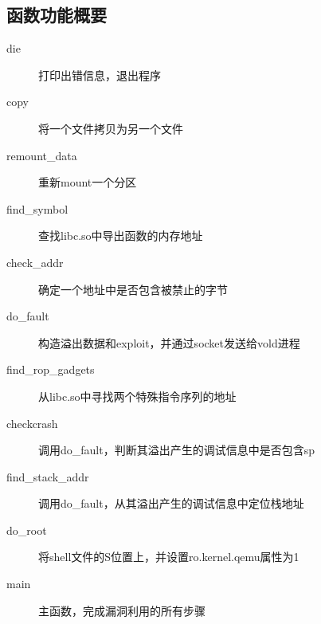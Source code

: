 \subsection{函数功能概要}

\begin{description}
\item[die] 打印出错信息，退出程序
\item[copy] 将一个文件拷贝为另一个文件
\item[remount\_data] 重新mount一个分区
\item[find\_symbol] 查找libc.so中导出函数的内存地址
\item[check\_addr] 确定一个地址中是否包含被禁止的字节
\item[do\_fault] 构造溢出数据和exploit，并通过socket发送给vold进程
\item[find\_rop\_gadgets] 从libc.so中寻找两个特殊指令序列的地址
\item[checkcrash] 调用do\_fault，判断其溢出产生的调试信息中是否包含sp
\item[find\_stack\_addr] 调用do\_fault，从其溢出产生的调试信息中定位栈地址
\item[do\_root] 将shell文件的S位置上，并设置ro.kernel.qemu属性为1
\item[main] 主函数，完成漏洞利用的所有步骤
\end{description}

